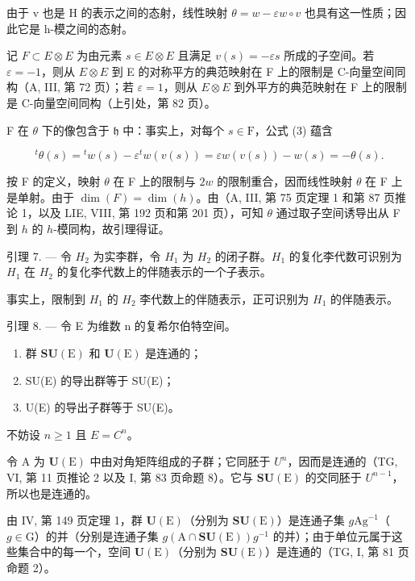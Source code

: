 由于 v 也是 H 的表示之间的态射，线性映射 \(\theta = w - \varepsilon w \circ v\) 也具有这一性质；因此它是 h-模之间的态射。

记 \(F \subset E \otimes E\) 为由元素 \(s \in E \otimes E\) 且满足 \(v(s) = -\varepsilon s\) 所成的子空间。若 \(\varepsilon = -1\)，则从 \(E \otimes E\) 到 E 的对称平方的典范映射在 F 上的限制是 C-向量空间同构（A, III, 第 72 页）；若 \(\varepsilon = 1\)，则从 \(E \otimes E\) 到外平方的典范映射在 F 上的限制是 C-向量空间同构（上引处，第 82 页）。

F 在 \(\theta\) 下的像包含于 \(\mathfrak{h}\) 中：事实上，对每个 \(s\in\mathrm{F}\)，公式 (3) 蕴含

\[
{ } ^ { t } \theta ( s ) = { } ^ { t } w ( s ) - \varepsilon { } ^ { t } w ( v ( s ) ) = \varepsilon w ( v ( s ) ) - w ( s ) = - \theta ( s ) .
\]

按 F 的定义，映射 \(\theta\) 在 F 上的限制与 \(2w\) 的限制重合，因而线性映射 \(\theta\) 在 F 上是单射。由于 \(\dim(F) = \dim(h)\)。由（A, III, 第 75 页定理 1 和第 87 页推论 1，以及 LIE, VIII, 第 192 页和第 201 页），可知 \(\theta\) 通过取子空间诱导出从 F 到 \(h\) 的 \(h\)-模同构，故引理得证。

引理 7. --- 令 \(H_{2}\) 为实李群，令 \(H_{1}\) 为 \(H_{2}\) 的闭子群。\(H_{1}\) 的复化李代数可识别为 \(H_{1}\) 在 \(H_{2}\) 的复化李代数上的伴随表示的一个子表示。

事实上，限制到 \(H_{1}\) 的 \(H_{2}\) 李代数上的伴随表示，正可识别为 \(H_{1}\) 的伴随表示。

引理 8. --- 令 E 为维数 n 的复希尔伯特空间。

\begin{enumerate}
\def\labelenumi{\alph{enumi})}
\item
  群 \(\mathbf{SU}(\mathrm{E})\) 和 \(\mathbf{U}(\mathrm{E})\) 是连通的；
\item
  SU(E) 的导出群等于 SU(E)；
\item
  U(E) 的导出子群等于 SU(E)。
\end{enumerate}

不妨设 \(n \geqslant 1\) 且 \(E = C^{n}\)。

令 A 为 \(\mathbf{U}(\mathrm{E})\) 中由对角矩阵组成的子群；它同胚于 \(U^{n}\)，因而是连通的（TG, VI, 第 11 页推论 2 以及 I, 第 83 页命题 8）。它与 \(\mathbf{SU}(\mathrm{E})\) 的交同胚于 \(U^{n-1}\)，所以也是连通的。

由 IV, 第 149 页定理 1，群 \(\mathbf{U}(\mathrm{E})\)（分别为 \(\mathbf{SU}(\mathrm{E})\)）是连通子集 \(g\mathrm{Ag}^{-1}\)（\(g \in \mathrm{G}\)）的并（分别是连通子集 \(g(\mathrm{A} \cap \mathbf{SU}(\mathrm{E}))g^{-1}\) 的并）；由于单位元属于这些集合中的每一个，空间 \(\mathbf{U}(\mathrm{E})\)（分别为 \(\mathbf{SU}(\mathrm{E})\)）是连通的（TG, I, 第 81 页命题 2）。

